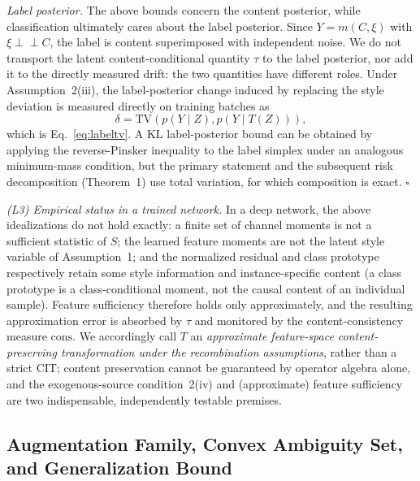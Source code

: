 \documentclass[electronics,article,submit,moreauthors]{Definitions/mdpi}
\begin{document}
\emph{Label posterior.} The above bounds concern the content posterior, while classification ultimately cares about the label posterior. Since $Y=m(C,\xi)$ with $\xi\perp\!\!\!\perp C$, the label is content superimposed with independent noise. We do not transport the latent content-conditional quantity $\tau$ to the label posterior, nor add it to the directly measured drift: the two quantities have different roles. Under Assumption~2(iii), the label-posterior change induced by replacing the style deviation is measured directly on training batches as
\begin{equation}
\delta=\mathrm{TV}\!\left(p(Y\mid Z),p(Y\mid T(Z))\right),
\end{equation}
which is Eq.~\eqref{eq:labeltv}. A KL label-posterior bound can be obtained by applying the reverse-Pinsker inequality to the label simplex under an analogous minimum-mass condition, but the primary statement and the subsequent risk decomposition (Theorem~1) use total variation, for which composition is exact. \hfill$\square$

\noindent\textit{(L3) Empirical status in a trained network.} In a deep network, the above idealizations do not hold exactly: a finite set of channel moments is not a sufficient statistic of $S$; the learned feature moments are not the latent style variable of Assumption~1; and the normalized residual and class prototype respectively retain some style information and instance-specific content (a class prototype is a class-conditional moment, not the causal content of an individual sample). Feature sufficiency therefore holds only approximately, and the resulting approximation error is absorbed by $\tau$ and monitored by the content-consistency measure $\mathrm{cons}$. We accordingly call $T$ an \emph{approximate feature-space content-preserving transformation under the recombination assumptions}, rather than a strict CIT; content preservation cannot be guaranteed by operator algebra alone, and the exogenous-source condition~2(iv) and (approximate) feature sufficiency are two indispensable, independently testable premises.

\subsection{Augmentation Family, Convex Ambiguity Set, and Generalization Bound}
\end{document}
